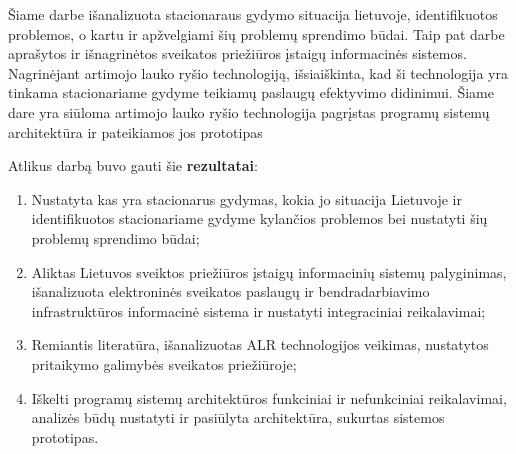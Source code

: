 Šiame darbe išanalizuota stacionaraus gydymo situacija lietuvoje, identifikuotos problemos, o kartu ir apžvelgiami šių problemų sprendimo būdai. Taip pat darbe aprašytos ir išnagrinėtos sveikatos priežiūros įstaigų informacinės sistemos. Nagrinėjant artimojo lauko ryšio technologiją, išsiaiškinta, kad ši technologija yra tinkama stacionariame gydyme teikiamų paslaugų efektyvimo didinimui. Šiame dare yra siūloma artimojo lauko ryšio technologija pagrįstas programų sistemų architektūra ir pateikiamos jos prototipas

Atlikus darbą buvo gauti šie \textbf{rezultatai}:
\begin{enumerate}
    \item Nustatyta kas yra stacionarus gydymas, kokia jo situacija Lietuvoje ir identifikuotos stacionariame gydyme kylančios problemos bei nustatyti šių problemų sprendimo būdai;
    \item Aliktas Lietuvos sveiktos priežiūros įstaigų informacinių sistemų palyginimas, išanalizuota elektroninės sveikatos paslaugų ir bendradarbiavimo infrastruktūros informacinė sistema ir nustatyti integraciniai reikalavimai;
    \item Remiantis literatūra, išanalizuotas ALR technologijos veikimas, nustatytos pritaikymo galimybės sveikatos priežiūroje;
    \item Iškelti programų sistemų architektūros funkciniai ir nefunkciniai reikalavimai, analizės būdų nustatyti ir pasiūlyta architektūra, sukurtas sistemos prototipas.
\end{enumerate}

